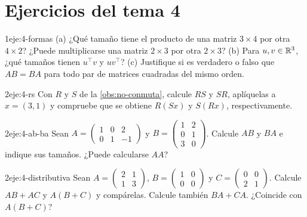 \section*{Ejercicios del tema 4}

\begin{ejercicio}{1}{eje:4-formas}
(a) ¿Qué tamaño tiene el producto de una matriz $3\times 4$ por otra $4\times 2$? ¿Puede multiplicarse una matriz $2\times 3$ por otra $2\times 3$? (b) Para $u,v\in\mathbb{R}^{3}$, ¿qué tamaños tienen $u^{\top}v$ y $uv^{\top}$? (c) Justifique si es verdadero o falso que $AB=BA$ para todo par de matrices cuadradas del mismo orden.
\end{ejercicio}

\begin{ejercicio}{2}{eje:4-rs}
Con $R$ y $S$ de la \cref{obs:no-conmuta}, calcule $RS$ y $SR$, aplíquelas a $x=(3,1)$ y compruebe que se obtiene $R(Sx)$ y $S(Rx)$, respectivamente.
\end{ejercicio}

\begin{ejercicio}{2}{eje:4-ab-ba}
Sean $A=\begin{pmatrix}1&0&2\\0&1&-1\end{pmatrix}$ y $B=\begin{pmatrix}1&2\\0&1\\3&0\end{pmatrix}$. Calcule $AB$ y $BA$ e indique sus tamaños. ¿Puede calcularse $AA$?
\end{ejercicio}

\begin{ejercicio}{2}{eje:4-distributiva}
Sean $A=\begin{pmatrix}2&1\\1&3\end{pmatrix}$, $B=\begin{pmatrix}1&0\\0&0\end{pmatrix}$ y $C=\begin{pmatrix}0&0\\2&1\end{pmatrix}$. Calcule $AB+AC$ y $A(B+C)$ y compárelas. Calcule también $BA+CA$. ¿Coincide con $A(B+C)$?
\end{ejercicio}

